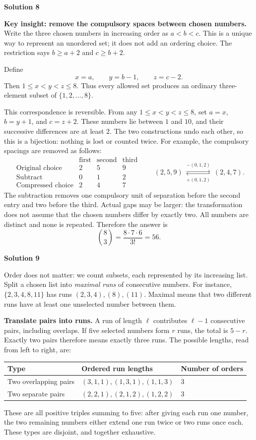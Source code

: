 \documentclass[11pt]{article}
\newcommand{\solution}[1]{%
  \par\Needspace{5\baselineskip}\addvspace{.8\baselineskip}%
  {\large\bfseries Solution #1\par}\nopagebreak[4]}
\begin{document}
\clearpage
\solution{8}
\textbf{Key insight: remove the compulsory spaces between chosen numbers.}
Write the three chosen numbers in increasing order as $a<b<c$.
This is a unique way to represent an unordered set; it does not add
an ordering choice. The restriction says $b\geq a+2$ and $c\geq b+2$.

Define
\[
x=a,\qquad y=b-1,\qquad z=c-2.
\]
Then $1\leq x<y<z\leq8$. Thus every allowed set produces an ordinary
three-element subset of $\{1,2,\ldots,8\}$.

This correspondence is reversible. From any $1\leq x<y<z\leq8$,
set $a=x$, $b=y+1$, and $c=z+2$. These numbers lie between $1$ and $10$,
and their successive differences are at least $2$. The two constructions
undo each other, so this is a bijection: nothing is lost or counted twice.
For example, the compulsory spacings are removed as follows:
\[
\begin{array}{c|ccc}
 &\text{first}&\text{second}&\text{third}\\\hline
\text{Original choice}&2&5&9\\
\text{Subtract}&0&1&2\\\hline
\text{Compressed choice}&2&4&7
\end{array}
\qquad
(2,5,9)\ \underset{+(0,1,2)}{\overset{-(0,1,2)}{\rightleftarrows}}\ (2,4,7).
\]
The subtraction removes one compulsory unit of separation before the
second entry and two before the third. Actual gaps may be larger:
the transformation does not assume that the chosen numbers differ
by exactly two. All numbers are distinct and none is repeated. Therefore the answer is
\[
\binom83=\frac{8\cdot7\cdot6}{3!}=\boxed{56}.
\]



\clearpage
\solution{9}
Order does not matter: we count subsets, each represented by its
increasing list. Split a chosen list into \emph{maximal runs} of
consecutive numbers. For instance, $\{2,3,4,8,11\}$ has runs
$(2,3,4),(8),(11)$. Maximal means that two different runs have at least
one unselected number between them.

\textbf{Translate pairs into runs.} A run of length $\ell$ contributes
$\ell-1$ consecutive pairs, including overlaps. If five selected numbers
form $r$ runs, the total is $5-r$. Exactly two pairs therefore means
exactly three runs. The possible lengths, read from left to right, are:
\begin{center}
\begin{tabular}{@{}lll@{}}
\toprule
Type & Ordered run lengths & Number of orders \\
\midrule
Two overlapping pairs & $(3,1,1),(1,3,1),(1,1,3)$ & $3$ \\
Two separate pairs & $(2,2,1),(2,1,2),(1,2,2)$ & $3$ \\
\bottomrule
\end{tabular}
\end{center}
These are all positive triples summing to five: after giving each run
one number, the two remaining numbers either extend one run twice or
two runs once each. These types are disjoint, and together exhaustive.
\end{document}
